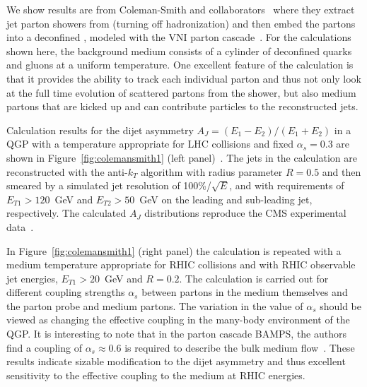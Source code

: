 We show results are from Coleman-Smith and
collaborators~\cite{ColemanSmith:2011rw,ColemanSmith:2011wd} where
they extract jet parton showers from \pythia (turning off
hadronization) and then embed the partons into a deconfined \qgp,
modeled with the VNI parton cascade~\cite{Geiger:1991nj}.  For the
calculations shown here, the background medium consists of a cylinder
of deconfined quarks and gluons at a uniform temperature.  One
excellent feature of the calculation is that it provides the ability
to track each individual parton and thus not only look at the full
time evolution of scattered partons from the shower, but also medium
partons that are kicked up and can contribute particles to the
reconstructed jets.

Calculation results for the dijet asymmetry $A_{J} =
(E_{1}-E_{2})/(E_{1}+E_{2})$ in a QGP with a temperature appropriate
for LHC collisions and fixed $\alpha_{s}=0.3$ are shown in
Figure~\ref{fig:colemansmith1} (left
panel)~\cite{ColemanSmith:2011rw}.  The jets in the calculation are
reconstructed with the anti-$k_T$ algorithm with radius parameter $R =
0.5$ and then smeared by a simulated jet resolution of
100\%/$\sqrt{E}$, and with requirements of $E_{T1}>120$~GeV and
$E_{T2}>50$~GeV on the leading and sub-leading jet, respectively.
The calculated $A_J$ distributions reproduce the CMS experimental
data~\cite{Chatrchyan:2011sx}.

In Figure~\ref{fig:colemansmith1} (right panel) the calculation is
repeated with a medium temperature appropriate for RHIC collisions and
with RHIC observable jet energies, $E_{T1} > 20$~GeV and $R = 0.2$.
The calculation is carried out for different coupling strengths
$\alpha_{s}$ between partons in the medium themselves and the parton
probe and medium partons.  The variation in the value of $\alpha_{s}$
should be viewed as changing the effective coupling in the many-body
environment of the QGP.  It is interesting to note that in the parton
cascade BAMPS, the authors find a coupling of $\alpha_{s} \approx 0.6$
is required to describe the bulk medium flow~\cite{Wesp:2011yy}.
These results indicate sizable modification to the dijet asymmetry and
thus excellent sensitivity to the effective coupling to the medium at
RHIC energies.  


